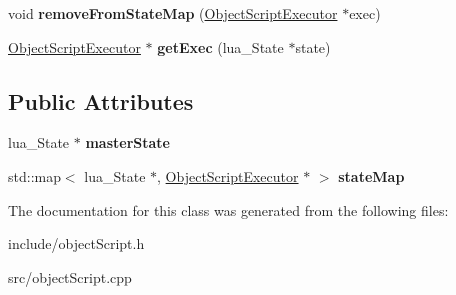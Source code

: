 \begin{DoxyCompactItemize}
\item 
\hypertarget{classObjectScriptManager_a75c9ed6835afd059b7c3bcec046bc7d8}{
void {\bfseries remove\-From\-State\-Map} (\hyperlink{classObjectScriptExecutor}{\-Object\-Script\-Executor} $\ast$exec)}
\label{d4/d09/classObjectScriptManager_a75c9ed6835afd059b7c3bcec046bc7d8}

\item 
\hypertarget{classObjectScriptManager_a3203ba0aaa5dbe3df849e20ed9a2f350}{
\hyperlink{classObjectScriptExecutor}{\-Object\-Script\-Executor} $\ast$ {\bfseries get\-Exec} (lua\-\_\-\-State $\ast$state)}
\label{d4/d09/classObjectScriptManager_a3203ba0aaa5dbe3df849e20ed9a2f350}

\end{DoxyCompactItemize}
\subsection*{\-Public \-Attributes}
\begin{DoxyCompactItemize}
\item 
\hypertarget{classObjectScriptManager_a2e84518e303fcbbc9ed6b0c49ed0bd82}{
lua\-\_\-\-State $\ast$ {\bfseries master\-State}}
\label{d4/d09/classObjectScriptManager_a2e84518e303fcbbc9ed6b0c49ed0bd82}

\item 
\hypertarget{classObjectScriptManager_a73e3bde2c236cba7f292459913603494}{
std\-::map$<$ lua\-\_\-\-State \*
$\ast$, \hyperlink{classObjectScriptExecutor}{\-Object\-Script\-Executor} $\ast$ $>$ {\bfseries state\-Map}}
\label{d4/d09/classObjectScriptManager_a73e3bde2c236cba7f292459913603494}

\end{DoxyCompactItemize}


\-The documentation for this class was generated from the following files\-:\begin{DoxyCompactItemize}
\item 
include/object\-Script.\-h\item 
src/object\-Script.\-cpp\end{DoxyCompactItemize}
